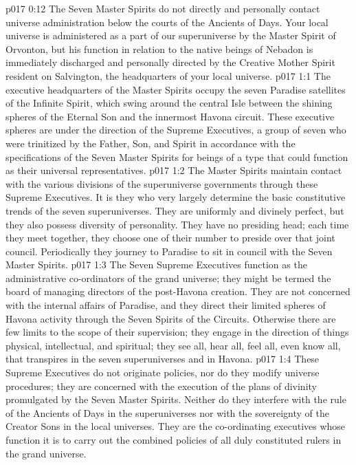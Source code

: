\vs p017 0:12 The Seven Master Spirits do not directly and personally contact universe administration below the courts of the Ancients of Days. Your local universe is administered as a part of our superuniverse by the Master Spirit of Orvonton, but his function in relation to the native beings of Nebadon is immediately discharged and personally directed by the Creative Mother Spirit resident on Salvington, the headquarters of your local universe.
\vs p017 1:1 The executive headquarters of the Master Spirits occupy the seven Paradise satellites of the Infinite Spirit, which swing around the central Isle between the shining spheres of the Eternal Son and the innermost Havona circuit. These executive spheres are under the direction of the Supreme Executives, a group of seven who were trinitized by the Father, Son, and Spirit in accordance with the specifications of the Seven Master Spirits for beings of a type that could function as their universal representatives.
\vs p017 1:2 The Master Spirits maintain contact with the various divisions of the superuniverse governments through these Supreme Executives. It is they who very largely determine the basic constitutive trends of the seven superuniverses. They are uniformly and divinely perfect, but they also possess diversity of personality. They have no presiding head; each time they meet together, they choose one of their number to preside over that joint council. Periodically they journey to Paradise to sit in council with the Seven Master Spirits.
\vs p017 1:3 \pc The Seven Supreme Executives function as the administrative co\hyp{}ordinators of the grand universe; they might be termed the board of managing directors of the post\hyp{}Havona creation. They are not concerned with the internal affairs of Paradise, and they direct their limited spheres of Havona activity through the Seven Spirits of the Circuits. Otherwise there are few limits to the scope of their supervision; they engage in the direction of things physical, intellectual, and spiritual; they see all, hear all, feel all, even know all, that transpires in the seven superuniverses and in Havona.
\vs p017 1:4 These Supreme Executives do not originate policies, nor do they modify universe procedures; they are concerned with the execution of the plans of divinity promulgated by the Seven Master Spirits. Neither do they interfere with the rule of the Ancients of Days in the superuniverses nor with the sovereignty of the Creator Sons in the local universes. They are the co\hyp{}ordinating executives whose function it is to carry out the combined policies of all duly constituted rulers in the grand universe.
